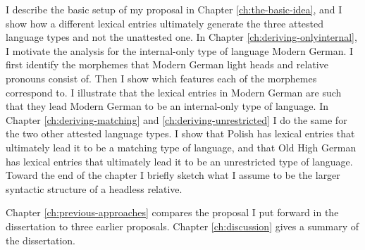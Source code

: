 I describe the basic setup of my proposal in Chapter \ref{ch:the-basic-idea}, and I show how a different lexical entries ultimately generate the three attested language types and not the unattested one.
In Chapter \ref{ch:deriving-onlyinternal}, I motivate the analysis for the internal-only type of language Modern German. I first identify the morphemes that Modern German light heads and relative pronouns consist of. Then I show which features each of the morphemes correspond to. I illustrate that the lexical entries in Modern German are such that they lead Modern German to be an internal-only type of language.
In Chapter \ref{ch:deriving-matching} and \ref{ch:deriving-unrestricted} I do the same for the two other attested language types. I show that Polish has lexical entries that ultimately lead it to be a matching type of language, and that Old High German has lexical entries that ultimately lead it to be an unrestricted type of language.
Toward the end of the chapter I briefly sketch what I assume to be the larger syntactic structure of a headless relative.

Chapter \ref{ch:previous-approaches} compares the proposal I put forward in the dissertation to three earlier proposals.
Chapter \ref{ch:discussion} gives a summary of the dissertation.

